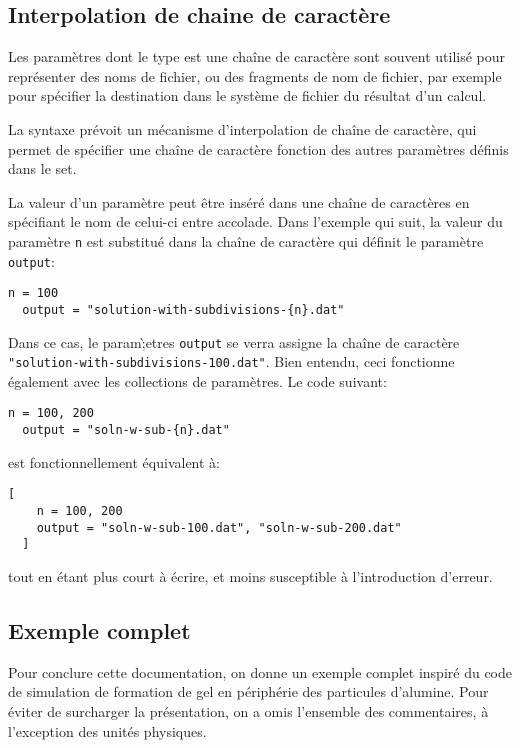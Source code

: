 \subsection{Interpolation de chaine de caract\`ere}
Les param\`etres dont le type est une cha\^ine de caract\`ere sont
souvent utilis\'e pour repr\'esenter des noms de fichier, ou des
fragments de nom de fichier, par exemple pour sp\'ecifier la
destination dans le syst\`eme de fichier du r\'esultat d'un calcul.

La syntaxe pr\'evoit un m\'ecanisme d'interpolation de cha\^ine de
caract\`ere, qui permet de sp\'ecifier une cha\^ine de caract\`ere
fonction des autres param\`etres d\'efinis dans le set.

La valeur d'un param\`etre peut \^etre ins\'er\'e dans une cha\^ine de
caract\`eres en sp\'ecifiant le nom de celui-ci entre accolade. Dans
l'exemple qui suit, la valeur du param\`etre \texttt{n} est
substitu\'e dans la cha\^ine de caract\`ere qui d\'efinit le
param\`etre \texttt{output}:
\begin{lstlisting}[language={},frame=single,basicstyle=\ttfamily]
  n = 100
  output = "solution-with-subdivisions-{n}.dat"
\end{lstlisting}
Dans ce cas, le param\`;etres \texttt{output} se verra assigne la
cha\^ine de caract\`ere
\texttt{"solution-with-subdivisions-100.dat"}. Bien entendu, ceci
fonctionne \'egalement avec les collections de param\`etres. Le code
suivant:
\begin{lstlisting}[language={},frame=single,basicstyle=\ttfamily]
  n = 100, 200
  output = "soln-w-sub-{n}.dat"
\end{lstlisting}
est fonctionnellement \'equivalent \`a:
\begin{lstlisting}[language={},frame=single,basicstyle=\ttfamily]
  [
    n = 100, 200
    output = "soln-w-sub-100.dat", "soln-w-sub-200.dat"
  ]
\end{lstlisting}
tout en \'etant plus court \`a \'ecrire, et moins susceptible \`a
l'introduction d'erreur.



\subsection{Exemple complet}

Pour conclure cette documentation, on donne un exemple complet
inspir\'e du code de simulation de formation de gel en p\'eriph\'erie
des particules d'alumine. Pour \'eviter de surcharger la
pr\'esentation, on a omis l'ensemble des commentaires, \`a l'exception
des unit\'es physiques.


